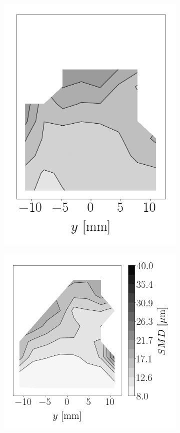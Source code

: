 \begin{figure}[h!]
\begin{subfigure}[b]{0.2\textwidth}
   \includegraphics[scale=0.4]{./part2_developments/figures_ch6_lagrangian_JICF/params_gaseous_initial_conditions/maps/ALM_FDC_0p24_SMD}
\end{subfigure}
\hspace*{0.00in}
\begin{subfigure}[b]{0.2\textwidth}
	\flushleft
   \includegraphics[scale=0.4]{./part2_developments/figures_ch6_lagrangian_JICF/params_gaseous_initial_conditions/maps/ALM_FDC_0p30_SMD}
\end{subfigure}


\end{figure}
